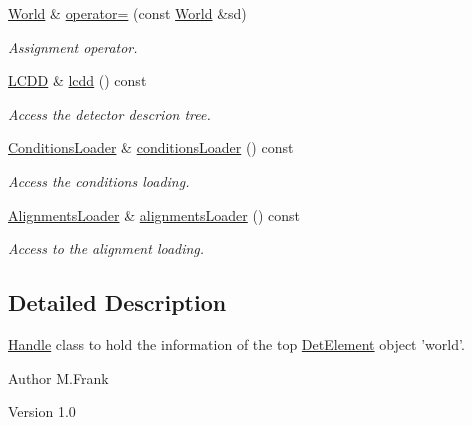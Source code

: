 \begin{DoxyCompactItemize}
\hyperlink{class_d_d4hep_1_1_geometry_1_1_world}{World} \& \hyperlink{class_d_d4hep_1_1_geometry_1_1_world_a8bff84a367718e07ad1e34ac48711327}{operator=} (const \hyperlink{class_d_d4hep_1_1_geometry_1_1_world}{World} \&sd)
\begin{DoxyCompactList}\small\item\em Assignment operator. \item\end{DoxyCompactList}\item 
\hyperlink{class_d_d4hep_1_1_geometry_1_1_l_c_d_d}{LCDD} \& \hyperlink{class_d_d4hep_1_1_geometry_1_1_world_a12698cbd31fbc6f7d3bdca85c7ff2976}{lcdd} () const 
\begin{DoxyCompactList}\small\item\em Access the detector descrion tree. \item\end{DoxyCompactList}\item 
\hyperlink{class_d_d4hep_1_1_conditions_1_1_conditions_loader}{ConditionsLoader} \& \hyperlink{class_d_d4hep_1_1_geometry_1_1_world_a3ebb7ff39c74dc435e717c91e02c6ac9}{conditionsLoader} () const 
\begin{DoxyCompactList}\small\item\em Access the conditions loading. \item\end{DoxyCompactList}\item 
\hyperlink{class_d_d4hep_1_1_alignments_1_1_alignments_loader}{AlignmentsLoader} \& \hyperlink{class_d_d4hep_1_1_geometry_1_1_world_a85938d09aaaa0b9f9c2b35f691ed95af}{alignmentsLoader} () const 
\begin{DoxyCompactList}\small\item\em Access to the alignment loading. \item\end{DoxyCompactList}\end{DoxyCompactItemize}


\subsection{Detailed Description}
\hyperlink{class_d_d4hep_1_1_handle}{Handle} class to hold the information of the top \hyperlink{class_d_d4hep_1_1_geometry_1_1_det_element}{DetElement} object 'world'. \begin{DoxyAuthor}{Author}
M.Frank 
\end{DoxyAuthor}
\begin{DoxyVersion}{Version}
1.0 
\end{DoxyVersion}


